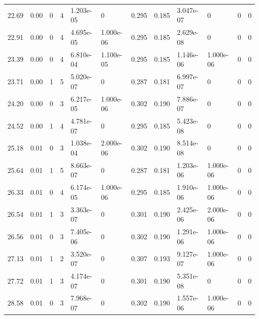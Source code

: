 \documentclass[preview]{standalone}
\begin{document}
{{\begin{tabular}{L{1.2cm}C{1.2cm} C{0.3cm}C{0.5cm} C{1.4cm}C{1.4cm} C{1.4cm}C{1.4cm} C{1.6cm}C{1.6cm} C{1.6cm}C{1.6cm}}
  22.69  &  0.00  & 0     &  4 &  1.203e-05  & 0  &  0.295&   0.185& 3.047e-07 & 0   &  0 & 0  \\ 
  22.91  &  0.00  & 0     &  4 &  4.695e-05  & 1.000e-06  &  0.295&   0.185& 2.629e-08 & 0   &  0 & 0  \\ 
  23.39  &  0.00  & 0     &  4 &  6.810e-04  & 1.100e-05  &  0.295&   0.185& 1.146e-06 & 1.000e-06   &  0 & 0  \\ 
  23.71  &  0.00  & 1     &  5 &  5.020e-07  & 0  &  0.287&   0.181& 6.997e-07 & 0   &  0 & 0  \\ 
  24.20  &  0.00  & 0     &  3 &  6.217e-05  & 1.000e-06  &  0.302&   0.190& 7.886e-07 & 0   &  0 & 0  \\ 
  24.52  &  0.00  & 1     &  4 &  4.781e-07  & 0  &  0.295&   0.185& 5.423e-08 & 0   &  0 & 0  \\ 
  25.18  &  0.01  & 0     &  3 &  1.038e-04  & 2.000e-06  &  0.302&   0.190& 8.514e-08 & 0   &  0 & 0  \\ 
  25.64  &  0.01  & 1     &  5 &  8.663e-07  & 0  &  0.287&   0.181& 1.203e-06 & 1.000e-06   &  0 & 0  \\ 
  26.33  &  0.01  & 0     &  4 &  6.174e-05  & 1.000e-06  &  0.295&   0.185& 1.910e-06 & 1.000e-06   &  0 & 0  \\ 
  26.54  &  0.01  & 1     &  3 &  3.363e-07  & 0  &  0.301&   0.190& 2.425e-06 & 2.000e-06   &  0 & 0  \\ 
  26.56  &  0.01  & 0     &  3 &  7.405e-06  & 0  &  0.302&   0.190& 1.291e-06 & 1.000e-06   &  0 & 0  \\ 
  27.13  &  0.01  & 1     &  2 &  3.520e-07  & 0  &  0.307&   0.193& 9.127e-07 & 1.000e-06   &  0 & 0  \\ 
  27.72  &  0.01  & 1     &  3 &  4.174e-07  & 0  &  0.301&   0.190& 5.351e-08 & 0   &  0 & 0  \\ 
  28.58  &  0.01  & 0     &  3 &  7.968e-07  & 0  &  0.302&   0.190& 1.557e-06 & 1.000e-06   &  0 & 0  \\ 
\hline 
\end{tabular} 

}}
\end{document}
